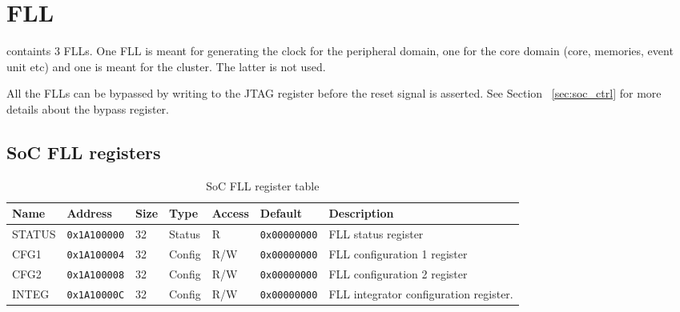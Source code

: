 \section{FLL}

\pulpissimo containts 3 FLLs. One FLL is meant for generating the clock for the
peripheral domain, one for the core domain (core, memories, event unit etc) and
one is meant for the cluster. The latter is not used.

All the FLLs can be bypassed by writing to the JTAG register before the reset
signal is asserted. See Section ~\ref{sec:soc_ctrl} for more details about the
bypass register.

\subsection{SoC FLL registers}
\begin{table}[htbp]
  \small
\begin{tabularx}{\textwidth}{|l|l|l|l|l|l|X|}
  \hline
  \textbf{Name} & \textbf{Address}  & \textbf{Size} & \textbf{Type} & \textbf{Access} & \textbf{Default} & \textbf{Description} \\
  \hline
  STATUS & \texttt{0x1A100000} & 32 & Status & R    & \texttt{0x00000000} & FLL status register \\
  \hline
  CFG1   & \texttt{0x1A100004} & 32 & Config & R/W    & \texttt{0x00000000} & FLL configuration 1 register \\
  \hline
  CFG2   & \texttt{0x1A100008} & 32 & Config & R/W    & \texttt{0x00000000} & FLL configuration 2 register \\
  \hline
  INTEG  & \texttt{0x1A10000C} & 32 & Config & R/W    & \texttt{0x00000000} & FLL integrator configuration register. \\
  \hline
\end{tabularx}
\caption{SoC FLL register table \label{tab:table_label}}
\end{table}



